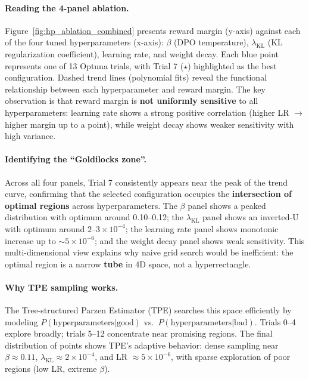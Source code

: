 \paragraph{Reading the 4-panel ablation.}
Figure~\ref{fig:hp_ablation_combined} presents reward margin (y-axis) against each of the four tuned hyperparameters (x-axis): $\beta$ (DPO temperature), $\lambda_{\text{KL}}$ (KL regularization coefficient), learning rate, and weight decay.
Each blue point represents one of 13 Optuna trials, with Trial 7 ($\star$) highlighted as the best configuration.
Dashed trend lines (polynomial fits) reveal the functional relationship between each hyperparameter and reward margin.
The key observation is that reward margin is \textbf{not uniformly sensitive} to all hyperparameters: learning rate shows a strong positive correlation (higher LR $\rightarrow$ higher margin up to a point), while weight decay shows weaker sensitivity with high variance.

\paragraph{Identifying the ``Goldilocks zone''.}
Across all four panels, Trial 7 consistently appears near the peak of the trend curve, confirming that the selected configuration occupies the \textbf{intersection of optimal regions} across hyperparameters.
The $\beta$ panel shows a peaked distribution with optimum around 0.10--0.12; the $\lambda_{\text{KL}}$ panel shows an inverted-U with optimum around $2$--$3 \times 10^{-4}$; the learning rate panel shows monotonic increase up to $\sim 5 \times 10^{-6}$; and the weight decay panel shows weak sensitivity.
This multi-dimensional view explains why naive grid search would be inefficient: the optimal region is a narrow \textbf{tube} in 4D space, not a hyperrectangle.

\paragraph{Why TPE sampling works.}
The Tree-structured Parzen Estimator (TPE) searches this space efficiently by modeling $P(\text{hyperparameters} | \text{good})$ vs.\ $P(\text{hyperparameters} | \text{bad})$.
Trials 0--4 explore broadly; trials 5--12 concentrate near promising regions.
The final distribution of points shows TPE's adaptive behavior: dense sampling near $\beta \approx 0.11$, $\lambda_{\text{KL}} \approx 2 \times 10^{-4}$, and LR $\approx 5 \times 10^{-6}$, with sparse exploration of poor regions (low LR, extreme $\beta$).

